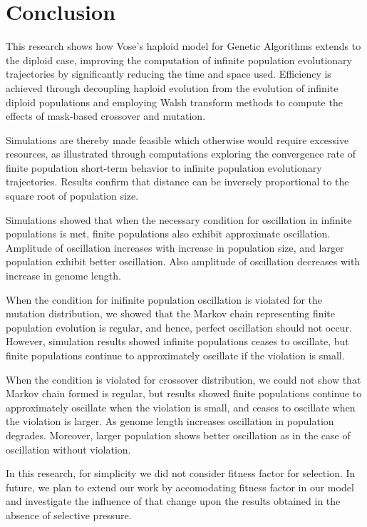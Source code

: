 \chapter{Conclusion}
This research shows how Vose's haploid model for Genetic Algorithms
extends to the diploid case, improving the computation of infinite
population evolutionary trajectories by significantly reducing the
time and space used.  Efficiency is achieved through decoupling
haploid evolution from the evolution of infinite diploid populations
and employing Walsh transform methods to compute the effects of
mask-based crossover and mutation.  

Simulations are thereby made feasible which otherwise would require
excessive resources, as illustrated through computations exploring 
the convergence rate of finite population short-term behavior to infinite population evolutionary trajectories. 
Results confirm that distance can be inversely proportional to the square root of population size.

Simulations showed that when the necessary condition for oscillation in infinite populations is met, 
finite populations also exhibit approximate oscillation. Amplitude of oscillation increases with 
increase in population size, and larger population exhibit better oscillation. Also amplitude of 
oscillation decreases with increase in genome length.

When the condition for inifinite population oscillation is violated for the mutation distribution, 
we showed that the Markov chain representing finite population evolution is regular, and hence, 
perfect oscillation should not occur. However, simulation results showed 
infinite populations ceases to oscillate, 
but finite populations continue to approximately oscillate if the violation is small. 

When the condition is violated for crossover distribution,
we could not show that Markov chain formed is regular, 
but results showed finite populations continue to approximately oscillate 
when the violation is small, and ceases to oscillate when the violation is larger. 
As genome length increases oscillation in population degrades. 
Moreover, larger population shows better oscillation 
as in the case of oscillation without violation.

In this research, for simplicity we did not consider fitness factor for selection.  
In future, we plan to extend our work by accomodating fitness factor in our model and investigate 
the influence of that change upon the results obtained in the absence of selective pressure.




